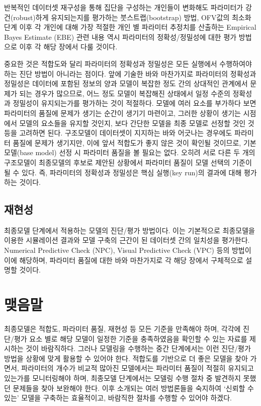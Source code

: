 \documentclass[
  11pt,
  krantz2, a4paper, twoside]{krantz}
\theoremstyle{definition}
\theoremstyle{definition}
\theoremstyle{definition}
\theoremstyle{remark}
\begin{document}
반복적인 데이터셋 재구성을 통해 집단을 구성하는 개인들이 변화해도 파라미터가 강건(robust)하게 유지되는지를 평가하는 붓스트랩(bootstrap) 방법, OFV값의 최소화 단계 이후 각 개인에 대해 가장 적절한 개인 별 파라미터 추정치를 산출하는 Empirical Bayes Estimate (EBE) 관련 내용 역시 파라미터의 정확성/정밀성에 대한 평가 방법으로 이후 각 해당 장에서 다룰 것이다.

중요한 것은 적합도와 달리 파라미터의 정확성과 정밀성은 모든 실행에서 수행하여야 하는 진단 방법이 아니라는 점이다. 앞에 기술한 바와 마찬가지로 파라미터의 정확성과 정밀성은 데이터에 포함된 정보의 양과 모델이 복잡한 정도 간의 상대적인 관계에서 문제가 되는 경우가 많으므로, 어느 정도 모델이 복잡해진 상태에서 일정 수준의 정확성과 정밀성이 유지되는가를 평가하는 것이 적절하다. 모델에 여러 요소를 부가하다 보면 파라미터의 품질에 문제가 생기는 순간이 생기기 마련이고, 그러한 상황이 생기는 시점에서 모델의 요소들을 유지할 것인지, 보다 간단한 모델을 최종 모델로 선정할 것인 것 등을 고려하면 된다. 구조모델이 데이터셋이 지지하는 바와 어긋나는 경우에도 파라미터 품질에 문제가 생기지만, 이에 앞서 적합도가 좋지 않은 것이 확인될 것이므로, 기본모델(base model) 선정 시 파라미터 품질을 볼 필요는 없다. 오히려 서로 다른 두 개의 구조모델이 최종모델의 후보로 제안된 상황에서 파라미터 품질이 모델 선택의 기준이 될 수 있다. 즉, 파라미터의 정확성과 정밀성은 핵심 실행(key run)의 결과에 대해 평가하는 것이다.

\hypertarget{uxc7acuxd604uxc131}{%
\subsection{재현성}\label{uxc7acuxd604uxc131}}

최종모델 단계에서 적용하는 모델의 진단/평가 방법이다. 이는 기본적으로 최종모델을 이용한 시뮬레이션 결과와 모델 구축의 근간이 된 데이터셋 간의 일치성을 평가한다. Numerical Predictive Check (NPC), Visual Predictive Check (VPC) 등의 방법이 이에 해당하며, 파라미터 품질에 대한 바와 마찬가지로 각 해당 장에서 구체적으로 설명할 것이다.

\hypertarget{uxb9fauxc74cuxb9d0}{%
\section{맺음말}\label{uxb9fauxc74cuxb9d0}}

최종모델은 적합도, 파라미터 품질, 재현성 등 모든 기준을 만족해야 하며, 각각에 진단/평가 요소 별로 해당 모델이 일정한 기준을 충족하였음을 확인할 수 있는 자료를 제시하는 것이 바람직하다. 그러나 모델링을 수행하는 중간 단계에서는 이런 진단/평가 방법을 상황에 맞게 활용할 수 있어야 한다. 적합도를 기반으로 더 좋은 모델을 찾아 가면서, 파라미터의 개수가 비교적 많아진 모델에서는 파라미터 품질이 적절히 유지되고 있는가를 모니터링해야 하며, 최종모델 단계에서는 모델링 수행 절차 중 발견하지 못했던 문제들을 찾아 보완해야 한다. 이후 소개되는 여러 방법론들을 숙지하여 `신뢰할 수 있는' 모델을 구축하는 효율적이고, 바람직한 절차를 수행할 수 있어야 하겠다.
\end{document}
